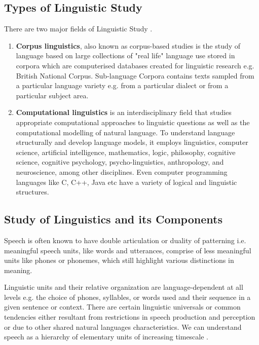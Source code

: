 \subsection{Types of Linguistic Study}
There are two major fields of Linguistic Study \cite{juang_automatic_2005}.

\begin{enumerate}
\item \textbf{Corpus linguistics}, also known as corpus-based studies is the study of language based on large collections of "real life" language use stored in corpora which are computerised databases created for linguistic research e.g. British National Corpus. Sub-language Corpora contains texts sampled from a particular language variety e.g. from a particular dialect or from a particular subject area. 

\item \textbf{Computational linguistics} is an interdisciplinary field that studies appropriate computational approaches to linguistic questions as well as the computational modelling of natural language. To understand language structurally and develop language models, it employs linguistics, computer science, artificial intelligence, mathematics, logic, philosophy, cognitive science, cognitive psychology, psycho-linguistics, anthropology, and neuroscience, among other disciplines. Even computer programming languages like C, C++, Java etc have a variety of logical and linguistic structures.
\end{enumerate}

\subsection{Study of Linguistics and its Components}
\quad Speech is often known to have double articulation or duality of patterning i.e. meaningful speech units, like words and utterances, comprise of less meaningful units like phones or phonemes, which still highlight various distinctions in meaning. 

\quad Linguistic units and their relative organization are language-dependent at all levels e.g. the choice of phones, syllables, or words used and their sequence in a given sentence or context. There are certain linguistic universals or common tendencies either resultant from restrictions in speech production and perception or due to other shared natural languages characteristics. We can understand speech as a hierarchy of elementary units of increasing timescale \cite{backstrom_introduction_2022}.

